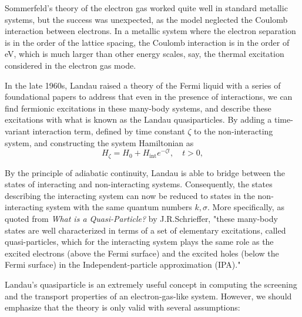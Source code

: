 Sommerfeld's theory of the electron gas worked quite well in standard metallic systems, but the success was unexpected, as the model neglected the Coulomb interaction between electrons. In a metallic system where the electron separation is in the order of the lattice spacing, the Coulomb interaction is in the order of eV, which is much larger than other energy scales, say, the thermal excitation considered in the electron gas mode. 

In the late 1960s, Landau raised a theory of the Fermi liquid with a series of foundational papers\cite{Landau1956,Landau1957} to address that even in the presence of interactions, we can find fermionic excitations in these many-body systems, and describe these excitations with what is known as the Landau quasiparticles. By adding a time-variant interaction term, defined by time constant $\zeta$ to the non-interacting system, and constructing the system Hamiltonian as
\begin{equation}\label{adiabatic}
	H_{\zeta} = H_0 + H_{\text{int}} e^{-\zeta t}, \quad t > 0,
\end{equation}

By the principle of adiabatic continuity, Landau is able to bridge between the states of interacting and non-interacting systems. Consequently, the states describing the interacting system can now be reduced to states in the non-interacting system with the same quantum numbers $k, \sigma$. More specifically, as quoted from \textit{What is a Quasi-Particle?} by J.R.Schrieffer, "these many-body states are well characterized in terms of a set of elementary excitations, called quasi-particles, which for the interacting system plays the same role as the excited electrons (above the Fermi surface) and the excited holes (below the Fermi surface) in the Independent-particle approximation (IPA)." \cite{schriefferWhatQuasiparticle1970}

Landau's quasiparticle is an extremely useful concept in computing the screening and the transport properties of an electron-gas-like system. However, we should emphasize that the theory is only valid with several assumptions:

